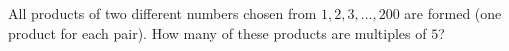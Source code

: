 All products of two different numbers chosen from $1,2,3,\dots,200$ are formed (one product for each pair). How many of these products are multiples of $5$?
